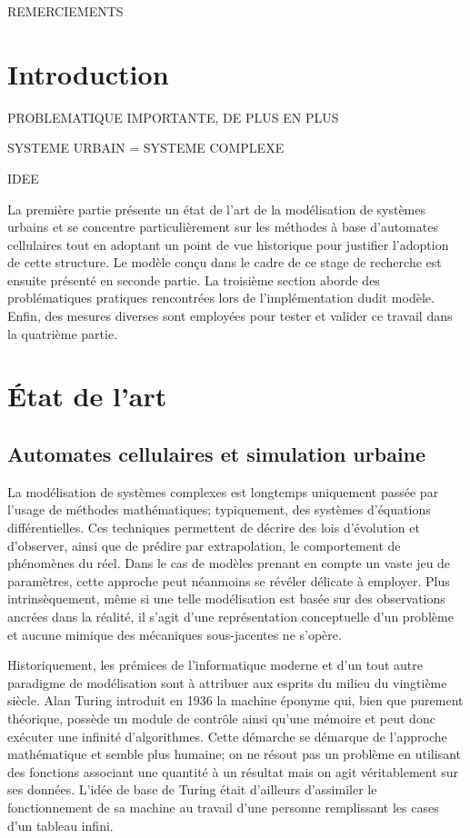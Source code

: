 \documentclass[12pt]{article}
\begin{document}
\newpage

\tableofcontents

\newpage

REMERCIEMENTS

\newpage

\section{Introduction}

PROBLEMATIQUE IMPORTANTE, DE PLUS EN PLUS

SYSTEME URBAIN = SYSTEME COMPLEXE

IDEE

La première partie présente un état de l'art de la modélisation de
systèmes urbains et se concentre particulièrement sur les méthodes à
base d'automates cellulaires tout en adoptant un point de vue
historique pour justifier l'adoption de cette structure. Le modèle
conçu dans le cadre de ce stage de recherche est ensuite présenté en
seconde partie. La troisième section aborde des problématiques
pratiques rencontrées lors de l'implémentation dudit modèle. Enfin,
des mesures diverses sont employées pour tester et valider ce travail
dans la quatrième partie.

\section{\'Etat de l'art}

\subsection{Automates cellulaires et simulation urbaine}

La modélisation de systèmes complexes est longtemps uniquement passée
par l'usage de méthodes mathématiques; typiquement, des systèmes
d'équations différentielles. Ces techniques permettent de décrire des
lois d'évolution et d'observer, ainsi que de prédire par
extrapolation, le comportement de phénomènes du réel. Dans le cas de
modèles prenant en compte un vaste jeu de paramètres, cette approche
peut néanmoins se révéler délicate à employer. Plus intrinsèquement,
même si une telle modélisation est basée sur des observations ancrées
dans la réalité, il s'agit d'une représentation conceptuelle d'un
problème et aucune mimique des mécaniques sous-jacentes ne s'opère.

Historiquement, les prémices de l'informatique moderne et d'un tout
autre paradigme de modélisation sont à attribuer aux esprits du milieu
du vingtième siècle. Alan Turing introduit en 1936 la machine éponyme
qui, bien que purement théorique, possède un module de contrôle ainsi
qu'une mémoire et peut donc exécuter une infinité d'algorithmes. Cette
démarche se démarque de l'approche mathématique et semble plus
humaine; on ne résout pas un problème en utilisant des fonctions
associant une quantité à un résultat mais on agit véritablement sur
ses données. L'idée de base de Turing était d'ailleurs d'assimiler le
fonctionnement de sa machine au travail d'une personne remplissant les
cases d'un tableau infini.
\end{document}
